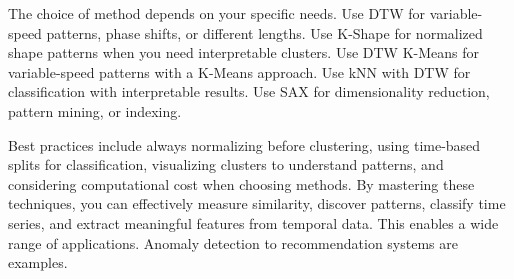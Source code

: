 The choice of method depends on your specific needs. Use DTW for variable-speed patterns, phase shifts, or different lengths. Use K-Shape for normalized shape patterns when you need interpretable clusters. Use DTW K-Means for variable-speed patterns with a K-Means approach. Use kNN with DTW for classification with interpretable results. Use SAX for dimensionality reduction, pattern mining, or indexing.

Best practices include always normalizing before clustering, using time-based splits for classification, visualizing clusters to understand patterns, and considering computational cost when choosing methods. By mastering these techniques, you can effectively measure similarity, discover patterns, classify time series, and extract meaningful features from temporal data. This enables a wide range of applications. Anomaly detection to recommendation systems are examples.

